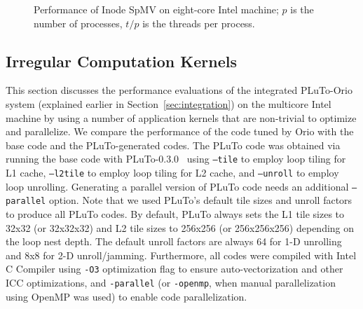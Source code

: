 \begin{figure} [thb]
\begin{center} 
    
\end{center}
\vspace{-.2in} 
\caption{Performance of Inode SpMV on eight-core Intel machine; $p$ is the number of processes, $t/p$ is the threads per process.} 
\label{fig:ex27-cookie-results} 
\end{figure} 

\subsection{Irregular Computation Kernels} 

This section discusses the performance evaluations of the integrated
PLuTo-Orio system (explained earlier in Section~\ref{sec:integration})
on the multicore Intel machine by using a number of application
kernels that are non-trivial to optimize and parallelize. We compare
the performance of the code tuned by Orio with the base code and the
PLuTo-generated codes. The PLuTo code was obtained via running the
base code with PLuTo-0.3.0~\cite{pluto030} using \texttt{--tile} to
employ loop tiling for L1 cache,
\texttt{--l2tile} to employ loop tiling for L2 cache, and
\texttt{--unroll} to employ loop unrolling. Generating a parallel
version of PLuTo code needs an additional \texttt{--parallel}
option. Note that we used PLuTo's default tile sizes and unroll
factors to produce all PLuTo codes. By default, PLuTo always sets the
L1 tile sizes to 32x32 (or 32x32x32) and L2 tile sizes to 256x256 (or
256x256x256) depending on the loop nest depth. The default unroll
factors are always 64 for 1-D unrolling and 8x8 for 2-D
unroll/jamming. Furthermore, all codes were compiled with Intel C
Compiler using \texttt{-O3} optimization flag to ensure
auto-vectorization and other ICC optimizations, and \texttt{-parallel}
(or \texttt{-openmp}, when manual parallelization using OpenMP was
used) to enable code parallelization.
 
